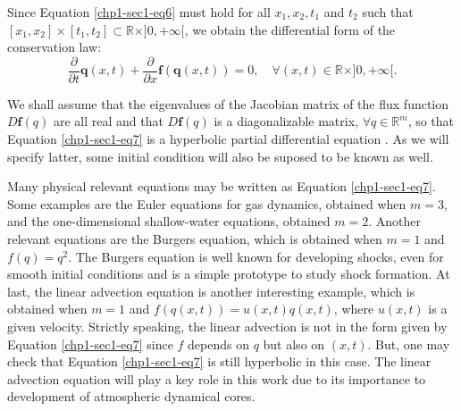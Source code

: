 Since Equation \eqref{chp1-sec1-eq6} must hold for all $x_1, x_2, t_1$ and $t_2$ such that
$[x_1, x_2] \times [t_1, t_2] \subset \mathbb{R}\times ]0, +\infty[$, we obtain the differential form of the conservation law:
\begin{equation}
	\label{chp1-sec1-eq7}
	\frac{\partial}{\partial t}\mathbf{q}(x, t) +
	\frac{\partial}{\partial x} \mathbf{f}(\mathbf{q}(x, t))
	= 0, \quad \forall (x,t) \in \mathbb{R}\times ]0, +\infty[. 
\end{equation}

We shall assume that the eigenvalues of the Jacobian matrix of the flux function
$D\mathbf{f}(q)$ are all real and that $D\mathbf{f}(q)$ is a diagonalizable matrix,
$\forall q \in \mathbb{R}^m$, so that Equation \eqref{chp1-sec1-eq7}
is a hyperbolic partial differential equation \citep{leveque:1990}. As we will 
specify latter, some initial condition will also be suposed to be known as well.

Many physical relevant equations may be written as Equation \eqref{chp1-sec1-eq7}.
Some examples are the Euler equations for gas dynamics, obtained when $m = 3$,
and the one-dimensional shallow-water equations, obtained $m = 2$.
Another relevant equations are the Burgers equation, which is obtained when
$m = 1$ and $f(q) = q^2$. The Burgers equation is well known for developing shocks,
even for smooth initial conditions and is a simple prototype to study shock formation.
At last, the linear advection equation is another interesting example, which is obtained
when $m = 1$ and $f(q(x,t)) = u(x,t)q(x,t)$, where $u(x,t)$ is a given velocity.
Strictly speaking, the linear advection is not in the form given by Equation
\eqref{chp1-sec1-eq7} since $f$ depends on $q$ but also on $(x,t)$.
But, one may check that Equation \eqref{chp1-sec1-eq7} is still hyperbolic
in this case. The linear advection equation will play a key role in this work due to its importance
to development of atmospheric dynamical cores.


